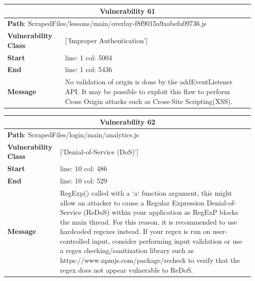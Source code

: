 \documentclass[12pt]{article}
\begin{document}
\vspace{0.7cm}
\FloatBarrier
\begin{table}[!h]
\centering
\renewcommand{\arraystretch}{1.3}
\begin{tabular}{|l|p{10cm}|}
\hline
\multicolumn{2}{|c|}{\textbf{Vulnerability 61}} \\
\hline
\multicolumn{2}{|l|}{\textbf{Path}: ScrapedFiles/lessons/main/overlay-f8f9015a9aabefa09736.js} \\
\hline
\textbf{Vulnerability Class} & ['Improper Authentication'] \\
\hline
\textbf{Start} & line: 1 \quad col: 5004 \\
\hline
\textbf{End} & line: 1 \quad col: 5436 \\
\hline
\textbf{Message} & No validation of origin is done by the addEventListener API. It may be possible to exploit this flaw to perform Cross Origin attacks such as Cross-Site Scripting(XSS). \\
\hline
\end{tabular}
\end{table}
\vspace{0.7cm}
\FloatBarrier
\begin{table}[!h]
\centering
\renewcommand{\arraystretch}{1.3}
\begin{tabular}{|l|p{10cm}|}
\hline
\multicolumn{2}{|c|}{\textbf{Vulnerability 62}} \\
\hline
\multicolumn{2}{|l|}{\textbf{Path}: ScrapedFiles/login/main/analytics.js} \\
\hline
\textbf{Vulnerability Class} & ['Denial-of-Service (DoS)'] \\
\hline
\textbf{Start} & line: 10 \quad col: 486 \\
\hline
\textbf{End} & line: 10 \quad col: 529 \\
\hline
\textbf{Message} & RegExp() called with a `a` function argument, this might allow an attacker to cause a Regular Expression Denial-of-Service (ReDoS) within your application as RegExP blocks the main thread. For this reason, it is recommended to use hardcoded regexes instead. If your regex is run on user-controlled input, consider performing input validation or use a regex checking/sanitization library such as https://www.npmjs.com/package/recheck to verify that the regex does not appear vulnerable to ReDoS. \\
\hline
\end{tabular}
\end{table}
\vspace{0.7cm}
\end{document}
